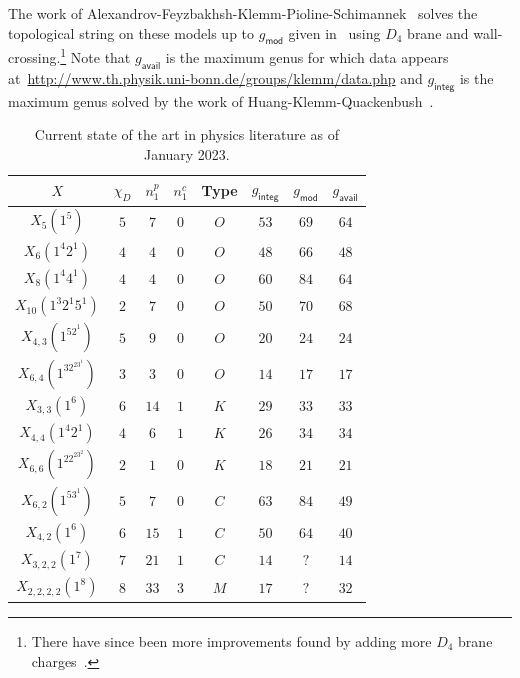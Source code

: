 \documentclass[10pt]{amsart}
\theoremstyle{definition}
\theoremstyle{remark}
\theoremstyle{plain}
\theoremstyle{definition}
\theoremstyle{remark}
\newcommand{\ms}[1]{\mathsf{#1}}
\newcommand{\1}{\mathbf{1}}
\newcommand{\2}{\mathbf{2}}
\newcommand{\3}{\mathbf{3}}
\begin{document}
The work of Alexandrov-Feyzbakhsh-Klemm-Pioline-Schimannek~\cite{qgeommod} solves the topological string on these models up to $g_{\ms{mod}}$ given in~ using $D_4$ brane and wall-crossing.\footnote{There have since been more improvements found by adding more $D_4$ brane charges~\cite{qgmm}.} Note that $g_{\ms{avail}}$ is the maximum genus for which data appears at~\url{http://www.th.physik.uni-bonn.de/groups/klemm/data.php} and $g_{\ms{integ}}$ is the maximum genus solved by the work of Huang-Klemm-Quackenbush~\cite{hkq}. 
\begin{table}[htpb]
    \centering
    \caption{Current state of the art in physics literature as of January 2023.}
    \label{tab:stateofart}
    \begin{tabular}{cccccccc}
        \toprule
        $X$                   & $\chi_D$ & $n_1^p$ & $n_1^c$ & Type & $g_{\ms{integ}}$ & $g_{\ms{mod}}$ & $g_{\ms{avail}}$ \\
        \midrule
        $X_5(1^5)$            & $5$ & $7$ & $0$ & $O$ & $53$ & $69$ & $64$ \\
        $X_6(1^4 2^1)$        & $4$ & $4$ & $0$ & $O$ & $48$ & $66$ & $48$ \\
        $X_8(1^4 4^1)$        & $4$ & $4$ & $0$ & $O$ & $60$ & $84$ & $64$ \\
        $X_{10}(1^3 2^1 5^1)$ & $2$ & $7$ & $0$ & $O$ & $50$ & $70$ & $68$ \\
        $X_{4,3}(1^52^1)$     & $5$ & $9$ & $0$ & $O$ & $20$ & $24$ & $24$ \\
        $X_{6,4}(1^32^23^1)$  & $3$ & $3$ & $0$ & $O$ & $14$ & $17$ & $17$ \\
        $X_{3,3}(1^6)$        & $6$ & $14$ & $1$ & $K$ & $29$ & $33$ & $33$ \\
        $X_{4,4}(1^4 2^1)$    & $4$ & $6$ & $1$ & $K$ & $26$ & $34$ & $34$ \\
        $X_{6,6}(1^22^23^2)$  & $2$ & $1$ & $0$ & $K$ & $18$ & $21$ & $21$ \\
        $X_{6,2}(1^53^1)$     & $5$ & $7$ & $0$ & $C$ & $63$ & $84$ & $49$ \\
        $X_{4,2}(1^6)$        & $6$ & $15$ & $1$ & $C$ & $50$ & $64$ & $40$ \\
        $X_{3,2,2}(1^7)$      & $7$ & $21$ & $1$ & $C$ & $14$ & $?$ & $14$ \\
        $X_{2,2,2,2}(1^8)$    & $8$ & $33$ & $3$ & $M$ & $17$ & $?$ & $32$ \\
        \bottomrule
    \end{tabular}
\end{table}
\end{document}
